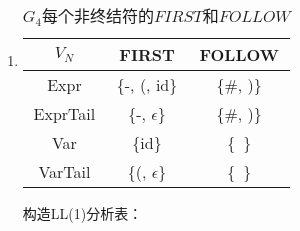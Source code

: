 \begin{enumerate}[1.]
\begin{enumerate}[(1)]
            \item 
            \begin{table}[b]
                \centering
                \begin{tabular}{|c|c|c|}
                    \hline
                    $V_N$ & FIRST & FOLLOW \\
                    \hline
                    Expr & \{-, (, id\} & \{\#, )\} \\
                    \hline
                    ExprTail & \{-, $\epsilon$\} & \{\#, )\} \\
                    \hline
                    Var & \{id\} & \{\ \} \\
                    \hline
                    VarTail & \{(, $\epsilon$\} & \{\ \} \\
                    \hline
                \end{tabular}
                \caption{$G_4每个非终结符的FIRST和FOLLOW$}
                \label{tab:G4FF}
            \end{table}
            
            构造LL(1)分析表：
            
            \begin{table}[H]
                \centering
                \caption{文法$G_4$的LL(1)分析表}
                \label{tab:G4M}
            \end{table}
        \end{enumerate}
\end{enumerate}
